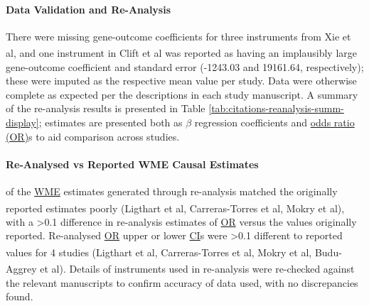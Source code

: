 \documentclass[
]{article}
\begin{document}
\paragraph{Data Validation and Re-Analysis}\label{data-validation-and-re-analysis}

\leavevmode\newline There were missing gene-outcome coefficients for three instruments from Xie et al\textsuperscript{}, and one instrument in Clift et al\textsuperscript{} was reported as having an implausibly large gene-outcome coefficient and standard error (-1243.03 and 19161.64, respectively); these were imputed as the respective mean value per study. Data were otherwise complete as expected per the descriptions in each study manuscript. A summary of the re-analysis results is presented in Table \ref{tab:citations-reanalysis-summ-display}; estimates are presented both as \(\beta\) regression coefficients and \hyperref[acronyms_OR]{odds ratio (OR)}s to aid comparison across studies.

\paragraph{Re-Analysed vs Reported WME Causal Estimates}\label{re-analysed-vs-reported-wme-causal-estimates}

\leavevmode{} of the \hyperref[acronyms_WME]{WME} estimates generated through re-analysis matched the originally reported estimates poorly (Ligthart et al\textsuperscript{}, Carreras-Torres et al\textsuperscript{}, Mokry et al\textsuperscript{}), with a \textgreater0.1 difference in re-analysis estimates of \hyperref[acronyms_OR]{OR} versus the values originally reported. Re-analysed \hyperref[acronyms_OR]{OR} upper or lower \hyperref[acronyms_CI]{CI}s were \textgreater0.1 different to reported values for 4 studies (Ligthart et al\textsuperscript{}, Carreras-Torres et al\textsuperscript{}, Mokry et al\textsuperscript{}, Budu-Aggrey et al\textsuperscript{}). Details of instruments used in re-analysis were re-checked against the relevant manuscripts to confirm accuracy of data used, with no discrepancies found.
\end{document}
